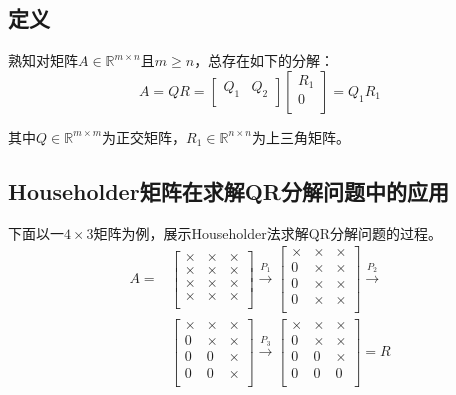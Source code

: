\documentclass[UTF8,a4paper,openany]{ctexbook}
\begin{document}
\subsection{定义}

熟知对矩阵$A\in\mathbb{R}^{m\times n}$且$m\ge n$，总存在如下的分解：
$$A=QR=\left[\begin{matrix}Q_1&Q_2\\\end{matrix}\right]\left[\begin{matrix}R_1\\0\\\end{matrix}\right]=Q_1R_1$$

其中$Q\in\mathbb{R}^{m\times m}$为正交矩阵，$R_1\in\mathbb{R}^{n\times n}$为上三角矩阵。

\subsection{Householder矩阵在求解QR分解问题中的应用}
下面以一$4\times3$矩阵为例，展示Householder法求解QR分解问题的过程。
\begin{align*}
	A=&\left[\begin{matrix}\times&\times&\times\\\times&\times&\times\\\times&\times&\times\\\times&\times&\times\\\end{matrix}\right]\xrightarrow{P_1}\left[\begin{matrix}\times&\times&\times\\0&\times&\times\\0&\times&\times\\0&\times&\times\\\end{matrix}\right]\xrightarrow{P_2}\\
	&\left[\begin{matrix}\times&\times&\times\\0&\times&\times\\0&0&\times\\0&0&\times\\\end{matrix}\right]\xrightarrow{P_3}\left[\begin{matrix}\times&\times&\times\\0&\times&\times\\0&0&\times\\0&0&0\\\end{matrix}\right]=R
\end{align*}
\end{document}

